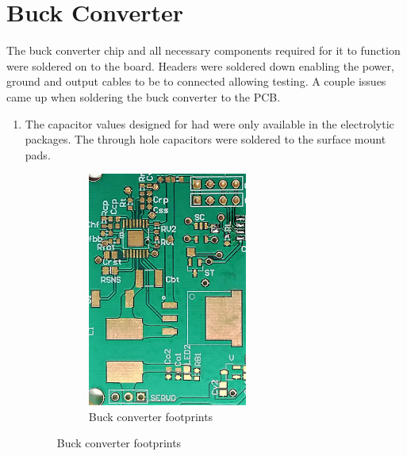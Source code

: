 \newpage
\section{Buck Converter}
\vspace{-3mm}
The buck converter chip and all necessary components required for it to function were soldered on to the board. Headers were soldered down enabling the power, ground and output cables to be to connected allowing testing. A couple issues came up when soldering the buck converter to the PCB.
\vspace{-5mm}
\begin{enumerate}
    \item The capacitor values designed for had were only available in the electrolytic packages. The through hole capacitors were soldered to the surface mount pads. 
    \vspace{-3mm}
    \begin{figure}[H]
      \centering
      \begin{minipage}[b]{0.45\textwidth}
        \begin{figure}[H]
            \centering
            \includegraphics[width=0.62\textwidth]{footprint_buckconverter.jpg}
            \caption{Buck converter footprints}
        \end{figure}
      \end{minipage}
      \hfill
      \begin{minipage}[b]{0.45\textwidth}

\end{minipage}
\end{figure}
\end{enumerate}
